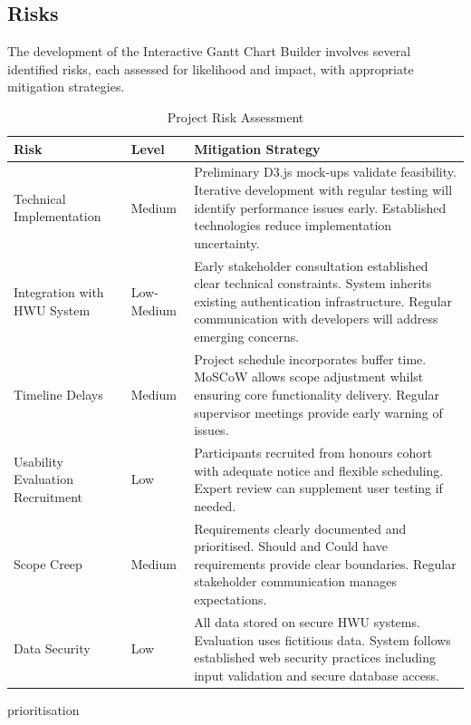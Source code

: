 \documentclass[12pt,nonacm,acmlarge,titlepage,screen]{acmart}
\begin{document}
\newpage
\subsection{Risks}

The development of the Interactive Gantt Chart Builder involves several identified risks, each assessed for likelihood and impact, with appropriate mitigation strategies.

\begin{table}[htbp] 
    \centering
    \small 
    
    \begin{tabularx}{\textwidth}{| p{3.5cm} | l | X |}
        \hline
        \textbf{Risk} & \textbf{Level} & \textbf{Mitigation Strategy} \\
        \hline
        Technical Implementation & Medium & Preliminary D3.js mock-ups validate feasibility. Iterative development with regular testing will identify performance issues early. Established technologies reduce implementation uncertainty. \\
        \hline
        Integration with HWU System & Low-Medium & Early stakeholder consultation established clear technical constraints. System inherits existing authentication infrastructure. Regular communication with developers will address emerging concerns. \\
        \hline
        Timeline Delays & Medium & Project schedule incorporates buffer time. MoSCoW  allows scope adjustment whilst ensuring core functionality delivery. Regular supervisor meetings provide early warning of issues. \\
        \hline
        Usability Evaluation Recruitment & Low & Participants recruited from honours cohort with adequate notice and flexible scheduling. Expert review can supplement user testing if needed. \\
        \hline
        Scope Creep & Medium & Requirements clearly documented and prioritised. Should and Could have requirements provide clear boundaries. Regular stakeholder communication manages expectations. \\
        \hline
        Data Security & Low & All data stored on secure HWU systems. Evaluation uses fictitious data. System follows established web security practices including input validation and secure database access. \\
        \hline
    \end{tabularx}prioritisation
    \caption{Project Risk Assessment}
    \label{tab:risks}
\end{table}
\clearpage
\end{document}
